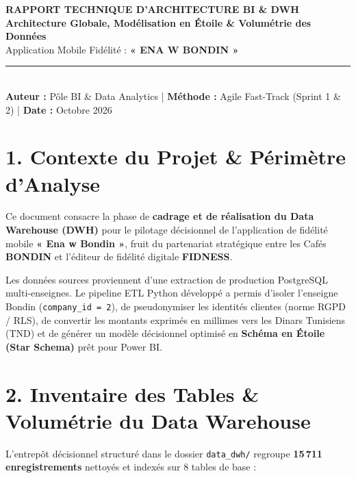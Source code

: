\documentclass[11pt,a4paper]{article}
\begin{document}
\begin{center}
    {\LARGE \bfseries \textcolor{bondinred}{RAPPORT TECHNIQUE D'ARCHITECTURE BI \& DWH}}\\[0.2cm]
    {\Large \bfseries \textcolor{fidnessblue}{Architecture Globale, Modélisation en Étoile \& Volumétrie des Données}}\\[0.12cm]
    {\large Application Mobile Fidélité : \textbf{« ENA W BONDIN »}}\\[0.25cm]
    \rule{\linewidth}{1.2pt}\\[0.15cm]
    \footnotesize \textbf{Auteur :} Pôle BI \& Data Analytics \quad | \quad \textbf{Méthode :} Agile Fast-Track (Sprint 1 \& 2) \quad | \quad \textbf{Date :} Octobre 2026
\end{center}

\vspace{0.15cm}

\section*{\textcolor{fidnessblue}{1. Contexte du Projet \& Périmètre d'Analyse}}
Ce document consacre la phase de \textbf{cadrage et de réalisation du Data Warehouse (DWH)} pour le pilotage décisionnel de l'application de fidélité mobile \textbf{« Ena w Bondin »}, fruit du partenariat stratégique entre les Cafés \textbf{BONDIN} et l'éditeur de fidélité digitale \textbf{FIDNESS}.

Les données sources proviennent d'une extraction de production PostgreSQL multi-enseignes. Le pipeline ETL Python développé a permis d'isoler l'enseigne Bondin (\texttt{company\_id = 2}), de pseudonymiser les identités clientes (norme RGPD / RLS), de convertir les montants exprimés en millimes vers les Dinars Tunisiens (TND) et de générer un modèle décisionnel optimisé en \textbf{Schéma en Étoile (Star Schema)} prêt pour Power BI.

\vspace{0.2cm}

\section*{\textcolor{fidnessblue}{2. Inventaire des Tables \& Volumétrie du Data Warehouse}}

L'entrepôt décisionnel structuré dans le dossier \texttt{data\_dwh/} regroupe \textbf{15\,711 enregistrements} nettoyés et indexés sur 8 tables de base :
\end{document}
